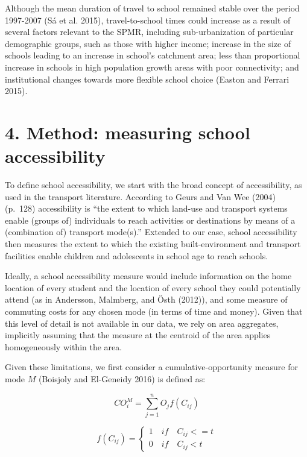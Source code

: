 \documentclass[]{article}
\begin{document}
Although the mean duration of travel to school remained stable over the
period 1997-2007 (S{á} et al. 2015), travel-to-school times could
increase as a result of several factors relevant to the SPMR, including
sub-urbanization of particular demographic groups, such as those with
higher income; increase in the size of schools leading to an increase in
school's catchment area; less than proportional increase in schools in
high population growth areas with poor connectivity; and institutional
changes towards more flexible school choice (Easton and Ferrari 2015).

\section{4. Method: measuring school
accessibility}\label{method-measuring-school-accessibility}

To define school accessibility, we start with the broad concept of
accessibility, as used in the transport literature. According to Geurs
and Van Wee (2004) (p.~128) accessibility is ``the extent to which
land-use and transport systems enable (groups of) individuals to reach
activities or destinations by means of a (combination of) transport
mode(s).'' Extended to our case, school accessibility then measures the
extent to which the existing built-environment and transport facilities
enable children and adolescents in school age to reach schools.

Ideally, a school accessibility measure would include information on the
home location of every student and the location of every school they
could potentially attend (as in Andersson, Malmberg, and {Ö}sth (2012)),
and some measure of commuting costs for any chosen mode (in terms of
time and money). Given that this level of detail is not available in our
data, we rely on area aggregates, implicitly assuming that the measure
at the centroid of the area applies homogeneously within the area.

Given these limitations, we first consider a cumulative-opportunity
measure for mode \(M\) (Boisjoly and El-Geneidy 2016) is defined as:

\[ CO_{i}^M= \sum_{j=1}^nO_{j}f(C_{ij}) \]

\[ f(C_{ij}) = \left\{ 
                \begin{array}{ll}
                  1\quad if\quad C_{ij}<=t\\
                  0\quad if\quad C_{ij}<t
                \end{array}
              \right.
\]
\end{document}
